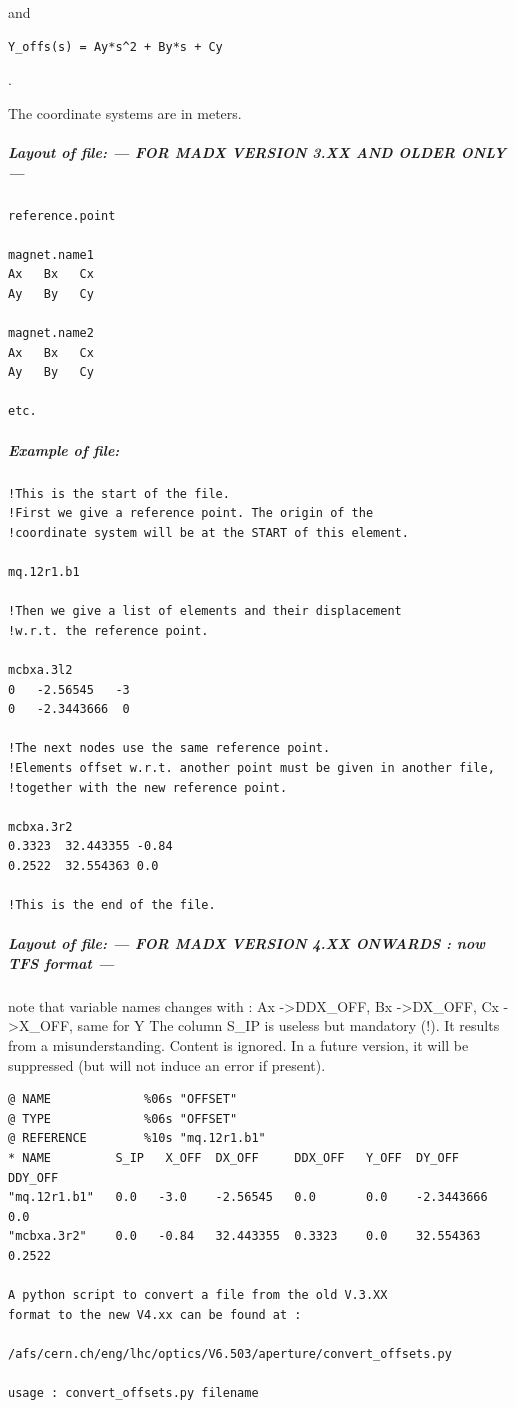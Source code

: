 and 
\begin{verbatim}
Y_offs(s) = Ay*s^2 + By*s + Cy
\end{verbatim}.

The coordinate systems are in meters. 

\subparagraph{Layout of file: --- FOR MADX VERSION 3.XX AND OLDER ONLY--- }
\begin{verbatim}
reference.point

magnet.name1
Ax   Bx   Cx
Ay   By   Cy

magnet.name2
Ax   Bx   Cx
Ay   By   Cy

etc.
\end{verbatim}

\subparagraph{Example of file:}
\begin{verbatim}
!This is the start of the file.
!First we give a reference point. The origin of the 
!coordinate system will be at the START of this element.

mq.12r1.b1

!Then we give a list of elements and their displacement 
!w.r.t. the reference point.

mcbxa.3l2
0   -2.56545   -3
0   -2.3443666  0

!The next nodes use the same reference point.
!Elements offset w.r.t. another point must be given in another file,
!together with the new reference point.

mcbxa.3r2
0.3323  32.443355 -0.84
0.2522  32.554363 0.0

!This is the end of the file.
\end{verbatim}

\subparagraph{Layout of file: --- FOR MADX VERSION 4.XX ONWARDS : now TFS format --- } 
note that variable names changes with : Ax -\textgreater DDX\_OFF,   Bx -\textgreater DX\_OFF,  Cx -\textgreater X\_OFF, same for Y The column S\_IP is useless but mandatory (!). It results from a misunderstanding. Content is ignored. In a future version, it will be suppressed (but will not induce an error if present). 

\begin{verbatim}
@ NAME             %06s "OFFSET" 
@ TYPE             %06s "OFFSET" 
@ REFERENCE        %10s "mq.12r1.b1" 
* NAME         S_IP   X_OFF  DX_OFF     DDX_OFF   Y_OFF  DY_OFF      DDY_OFF
"mq.12r1.b1"   0.0   -3.0    -2.56545   0.0       0.0    -2.3443666  0.0
"mcbxa.3r2"    0.0   -0.84   32.443355  0.3323    0.0    32.554363   0.2522

A python script to convert a file from the old V.3.XX 
format to the new V4.xx can be found at :

/afs/cern.ch/eng/lhc/optics/V6.503/aperture/convert_offsets.py

usage : convert_offsets.py filename
\end{verbatim}

